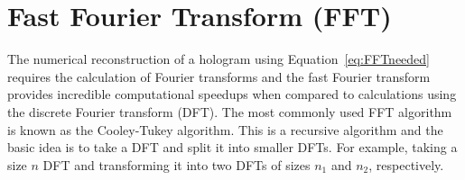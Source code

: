 %
%
%
%
%
%
%
%

    \section{Fast Fourier Transform (FFT) \label{sect:FFT}}

    The numerical reconstruction of a hologram using Equation~\ref{eq:FFTneeded}
    requires the calculation of Fourier transforms and the fast Fourier
    transform provides incredible computational speedups when compared to
    calculations using the discrete Fourier transform (DFT).
%
%
        The most commonly used FFT algorithm is known as the Cooley-Tukey algorithm.
        This is a recursive algorithm and the basic idea is to take a DFT and split it
        into smaller DFTs. For example, taking a size $n$ DFT and transforming it into
        two DFTs of sizes $n_1$ and $n_2$, respectively.

